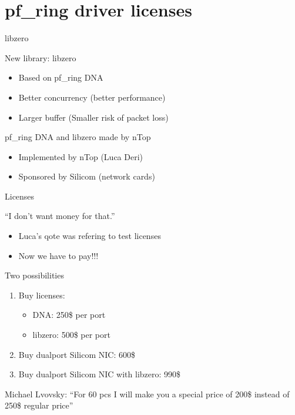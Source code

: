 \section{pf\_ring driver licenses}

\begin{frame}{libzero}{}
	\begin{block}{New library: libzero}
		\begin{itemize}
		  \item Based on pf\_ring DNA
		  \item Better concurrency (better performance)
		  \item Larger buffer (Smaller risk of packet loss)
		\end{itemize}
	\end{block}
	\begin{block}{pf\_ring DNA and libzero made by nTop}
		\begin{itemize}
		  \item Implemented by nTop (Luca Deri)
		  \item Sponsored by Silicom (network cards)
		\end{itemize}
	\end{block}
\end{frame}

\begin{frame}{Licenses}{}
	\begin{alertblock}{``I don't want money for that.''}
		\begin{itemize}
		  \item Luca's qote was refering to test licenses
		  \item Now we have to pay!!!
		\end{itemize}
	\end{alertblock}
	
	\begin{block}{Two possibilities}
		\begin{enumerate}
		  \item Buy licenses:
		  	\begin{itemize}
			  \item DNA: 250\$ per port
			  \item libzero: 500\$ per port
			\end{itemize}
			\item Buy dualport Silicom NIC: 600\$
			\item Buy dualport Silicom NIC with libzero: 990\$
		\end{enumerate}
	\end{block}
	Michael Lvovsky: ``For 60 pcs I will make you a special price of 200\$ instead
	of 250\$ regular price''
\end{frame}

